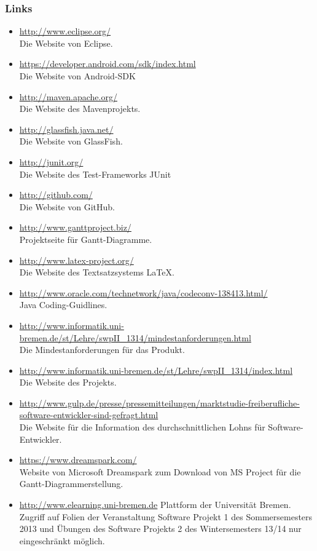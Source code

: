 \documentclass[fontsize=12pt,paper=a4,twoside]{scrartcl}
\begin{document}
\subsubsection{Links}
\begin{itemize}
\item{\url{http://www.eclipse.org/}\\ Die Website von Eclipse.} \item{\url{https://developer.android.com/sdk/index.html}\\ Die Website von Android-SDK}
\item{\url{http://maven.apache.org/}\\ Die Website des Mavenprojekts.}
\item{\url{http://glassfish.java.net/}\\ Die Website von GlassFish.}
\item{\url{http://junit.org/}\\ Die Website des Test-Frameworks JUnit}
\item{\url{http://github.com/}\\ Die Website von GitHub.}
\item{\url{http://www.ganttproject.biz/}\\ Projektseite für Gantt-Diagramme.}
\item{\url{http://www.latex-project.org/}\\ Die Website des Textsatzsystems \LaTeX.}
\item{\url{http://www.oracle.com/technetwork/java/codeconv-138413.html/}\\ Java Coding-Guidlines.}
\item{\url{http://www.informatik.uni-bremen.de/st/Lehre/swpII_1314/mindestanforderungen.html}\\ Die Mindestanforderungen für das Produkt.}
\item{\url{http://www.informatik.uni-bremen.de/st/Lehre/swpII_1314/index.html}\\ Die Website des Projekts.}
\item{\url{http://www.gulp.de/presse/pressemitteilungen/marktstudie-freiberufliche-software-entwickler-sind-gefragt.html}\\ Die Website für die Information des durchschnittlichen Lohns für Software-Entwickler.}
\item{\url{https://www.dreamspark.com/}\\Website von Microsoft Dreamspark zum Download von MS Project für die Gantt-Diagrammerstellung.}
\item{\url{http://www.elearning.uni-bremen.de} Plattform der Universität Bremen. Zugriff auf Folien der Veranstaltung Software Projekt 1 des Sommersemesters 2013 und Übungen des Software Projekts 2 des Wintersemesters 13/14 nur eingeschränkt möglich.}
\end{itemize}
\end{document}
